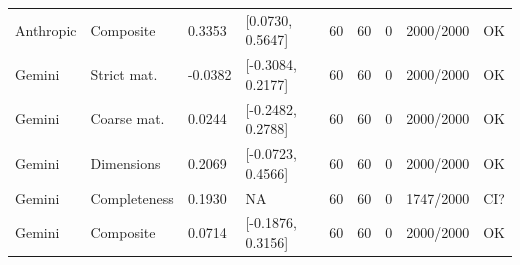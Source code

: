 \begin{table}[t]
{\begin{tabular}{lllllllll}
Anthropic & Composite & 0.3353 & [0.0730, 0.5647] & 60 & 60 & 0 & 2000/2000 & OK \\
Gemini & Strict mat. & -0.0382 & [-0.3084, 0.2177] & 60 & 60 & 0 & 2000/2000 & OK \\
Gemini & Coarse mat. & 0.0244 & [-0.2482, 0.2788] & 60 & 60 & 0 & 2000/2000 & OK \\
Gemini & Dimensions & 0.2069 & [-0.0723, 0.4566] & 60 & 60 & 0 & 2000/2000 & OK \\
Gemini & Completeness & 0.1930 & NA & 60 & 60 & 0 & 1747/2000 & CI? \\
Gemini & Composite & 0.0714 & [-0.1876, 0.3156] & 60 & 60 & 0 & 2000/2000 & OK \\
\bottomrule
\end{tabular}}
\end{table}

